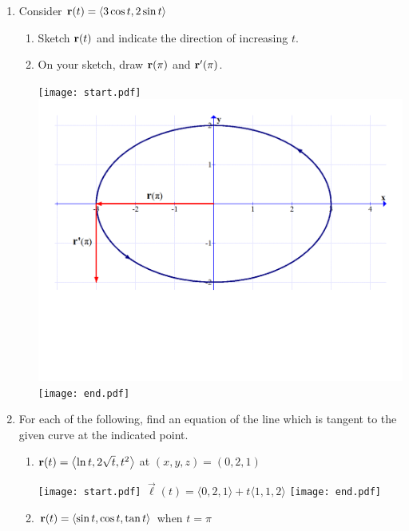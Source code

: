 \documentclass[12pt]{article}
\begin{document}
\begin{enumerate}
\begin{enumerate}
\end{enumerate}

\item Consider ${\bf r}(t)=\langle 3\cos{t},2\sin{t}\rangle$

\begin{enumerate}

\item Sketch ${\bf r}(t)$ and indicate the direction of increasing $t$.

\item On your sketch, draw ${\bf r}(\pi)$ and ${\bf r}^{\prime}(\pi)$.

\texttt{[image: start.pdf]}
{{\includegraphics[scale=0.3]{ellipse.pdf}}}
\texttt{[image: end.pdf]}


\end{enumerate}

\item For each of the following, find an equation of the line which is tangent to the given curve at the indicated point.

\begin{enumerate}

\item ${\bf r}(t)=\left\langle \ln{t}, 2\sqrt{t}, t^2\right\rangle$ at $(x,y,z)=(0,2,1)$

\texttt{[image: start.pdf]}
{{$\overrightarrow{\ell}(t)=\langle 0,2,1 \rangle + t\langle 1, 1, 2\rangle$}}
\texttt{[image: end.pdf]}


\item ${\bf r}(t)=\left\langle \sin{t},\cos{t},\tan{t}\right\rangle$ when $t=\pi$


\end{enumerate}
\end{enumerate}
\end{document}
